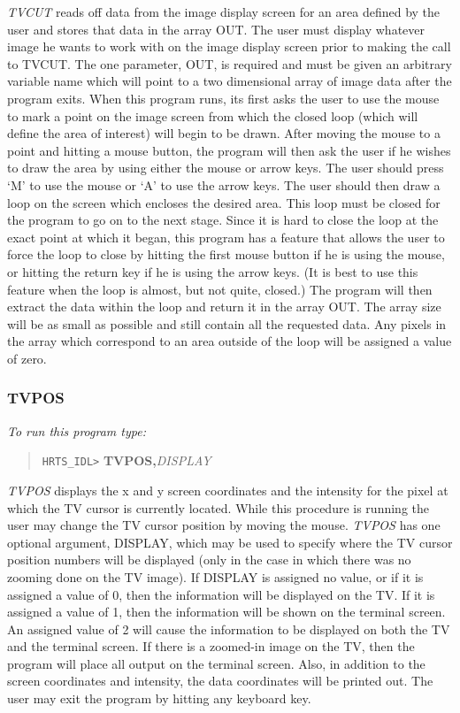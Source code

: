 {\em TVCUT} reads off data from the image display screen for an area defined by
the user and stores that data in the array OUT. The user must display whatever
image he wants to work with on the image display screen prior to making the
call to TVCUT.  The one parameter, OUT, is required and must be given an
arbitrary variable name which will point to a two dimensional array of image
data after the program exits.  When this program runs, its first asks the user
to use the mouse to mark a point on the image screen from which the closed loop
(which will define the area of interest) will begin to be drawn.  After moving
the mouse to a point and hitting a mouse button, the program will then ask the
user if he wishes to draw the area by using either the mouse or arrow keys.
The user should press `M' to use the mouse or `A' to use the arrow keys.  The
user should then draw a loop on the  screen which encloses the desired area.
This loop must be closed for the program to go on to the next stage.  Since it
is hard to close the loop at the exact point at which it began, this program
has a feature that allows the user to force the loop to close by hitting the
first mouse button if he is using the mouse, or hitting the return key if he is
using the arrow keys.  (It is best to use this feature when the loop is almost,
but not quite, closed.) The program will then extract the data within the loop
and return it in the array OUT.  The array size will be as small as possible
and still contain all the requested data.  Any pixels in the array which
correspond to an area outside of the loop will be assigned a value of zero.

\subsubsection{TVPOS}

{\em To run this program type:}
\begin{quote}
     {\tt HRTS\_IDL>} {\bf TVPOS,}{\it DISPLAY}
\end{quote}

{\em TVPOS} displays the x and y screen coordinates and the intensity for the
pixel at which the TV cursor is currently located.  While this procedure is
running the user may change the TV cursor position by moving the mouse.  {\em
TVPOS} has one optional argument, DISPLAY, which may be used to specify where
the TV cursor position numbers will be displayed (only in the case in which
there was no zooming done on the TV image).  If DISPLAY is assigned no value,
or if it is assigned a value of 0, then the information will be displayed on
the TV.  If it is assigned a value of 1, then the information will be shown on
the terminal screen.  An assigned value of 2 will cause the information to be
displayed on both the TV and the terminal screen.  If there is a zoomed-in
image on the TV, then the program will place all output on the terminal screen.
Also, in addition to the screen coordinates and intensity, the data coordinates
will be printed out. The user may exit the program by hitting any keyboard key.

